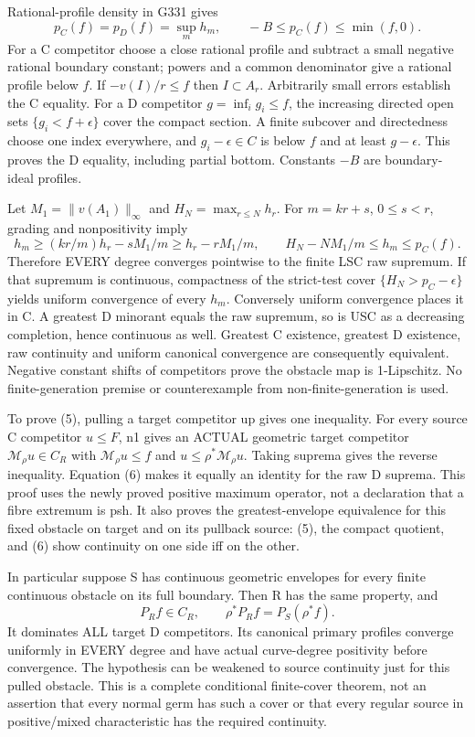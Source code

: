 \documentclass[11pt]{article}
\begin{document}
Rational-profile density in G331 gives
\[
 p_C(f)=p_D(f)=\sup_m h_m,
 \qquad -B\le p_C(f)\le\min(f,0).                          \tag{6}
\]
For a C competitor choose a close rational profile and subtract a small
negative rational boundary constant; powers and a common denominator
give a rational profile below $f$. If $-v(I)/r\le f$ then
$I\subset A_r$. Arbitrarily small errors establish the C equality.
For a D competitor $g=\inf_i g_i\le f$, the increasing directed open
sets $\{g_i<f+\epsilon\}$ cover the compact section. A finite subcover
and directedness choose one index everywhere, and $g_i-\epsilon\in C$
is below $f$ and at least $g-\epsilon$. This proves the D equality,
including partial bottom. Constants $-B$ are boundary-ideal profiles.

Let $M_1=\|v(A_1)\|_\infty$ and $H_N=\max_{r\le N}h_r$.
For $m=kr+s$, $0\le s<r$, grading and nonpositivity imply
\[
 h_m\ge (kr/m)h_r-sM_1/m\ge h_r-rM_1/m,
 \qquad H_N-NM_1/m\le h_m\le p_C(f).
\]
Therefore EVERY degree converges pointwise to the finite LSC raw
supremum. If that supremum is continuous, compactness of the strict-test
cover $\{H_N>p_C-\epsilon\}$ yields uniform convergence of every $h_m$.
Conversely uniform convergence places it in C. A greatest D minorant
equals the raw supremum, so is USC as a decreasing completion, hence
continuous as well. Greatest C existence, greatest D existence, raw
continuity and uniform canonical convergence are consequently equivalent.
Negative constant shifts of competitors prove the obstacle map is
1-Lipschitz. No finite-generation premise or counterexample from
non-finite-generation is used.

To prove (5), pulling a target competitor up gives one inequality.
For every source C competitor $u\le F$, n1 gives an ACTUAL geometric
target competitor $\mathcal M_\rho u\in C_R$ with
$\mathcal M_\rho u\le f$ and $u\le\rho^*\mathcal M_\rho u$.
Taking suprema gives the reverse inequality. Equation (6) makes it
equally an identity for the raw D suprema. This proof uses the newly
proved positive maximum operator, not a declaration that a fibre extremum
is psh. It also proves the greatest-envelope equivalence for this fixed
obstacle on target and on its pullback source: (5), the compact quotient,
and (6) show continuity on one side iff on the other.

In particular suppose S has continuous geometric envelopes for every
finite continuous obstacle on its full boundary. Then R has the same
property, and
\[
      P_R f\in C_R,\qquad \rho^*P_R f=P_S(\rho^*f).          \tag{7}
\]
It dominates ALL target D competitors. Its canonical primary profiles
converge uniformly in EVERY degree and have actual curve-degree
positivity before convergence. The hypothesis can be weakened to source
continuity just for this pulled obstacle. This is a complete conditional
finite-cover theorem, not an assertion that every normal germ has such
a cover or that every regular source in positive/mixed characteristic
has the required continuity.
\end{document}
